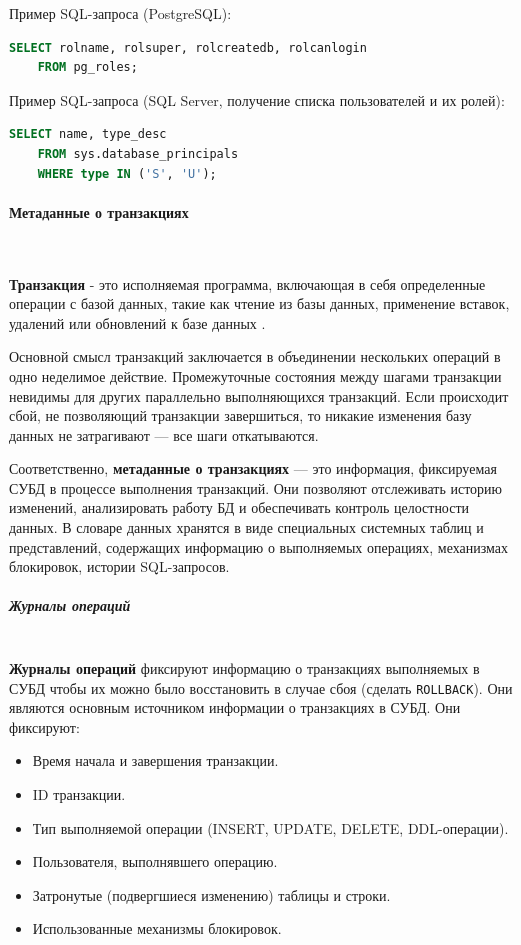 \begin{enumerate}
    Пример SQL-запроса (PostgreSQL):
    \begin{lstlisting}[language=SQL]
    SELECT rolname, rolsuper, rolcreatedb, rolcanlogin 
    FROM pg_roles;             
    \end{lstlisting}

    Пример SQL-запроса (SQL Server, получение списка пользователей и их ролей):
    \begin{lstlisting}[language=SQL]
    SELECT name, type_desc 
    FROM sys.database_principals 
    WHERE type IN ('S', 'U');              
    \end{lstlisting}

\end{enumerate}

\paragraph{Метаданные о транзакциях} ~\\

\begin{grayquote}
    \textbf{Транзакция} - это исполняемая программа, включающая в себя определенные операции с базой данных, такие как чтение из базы данных, применение вставок, удалений или обновлений к базе данных \autocite{ElmasriNavathe}.
\end{grayquote}

Основной смысл транзакций заключается в объединении нескольких операций в одно неделимое действие. Промежуточные состояния между шагами транзакции невидимы для других параллельно выполняющихся транзакций. Если происходит сбой, не позволяющий транзакции завершиться, то никакие изменения базу данных не затрагивают — все шаги откатываются. \autocite{PostgreSQLdocc3p4}

Соответственно, \textbf{метаданные о транзакциях} — это информация, фиксируемая СУБД в процессе выполнения транзакций. Они позволяют отслеживать историю изменений, анализировать работу БД и обеспечивать контроль целостности данных. В словаре данных хранятся в виде специальных системных таблиц и представлений, содержащих информацию о выполняемых операциях, механизмах блокировок, истории SQL-запросов.

\subparagraph{Журналы операций} ~\\

\textbf{Журналы операций} фиксируют информацию о транзакциях выполняемых в СУБД чтобы их можно было восстановить в случае сбоя (сделать \texttt{ROLLBACK}). Они являются основным источником информации о транзакциях в СУБД. Они фиксируют:
\begin{itemize}
    \item Время начала и завершения транзакции.
    \item ID транзакции.
    \item Тип выполняемой операции (INSERT, UPDATE, DELETE, DDL-операции).
    \item Пользователя, выполнявшего операцию.
    \item Затронутые (подвергшиеся изменению) таблицы и строки.
    \item Использованные механизмы блокировок.
\end{itemize}

